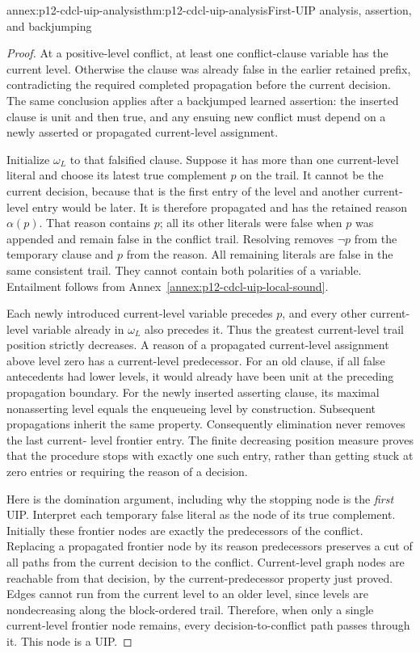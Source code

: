 \begin{annexitem}{annex:p12-cdcl-uip-analysis}{thm:p12-cdcl-uip-analysis}{First-UIP analysis, assertion, and backjumping}
\begin{proof}
At a positive-level conflict, at least one conflict-clause variable has the
current level.  Otherwise the clause was already false in the earlier retained
prefix, contradicting the required completed propagation before the current
decision.  The same conclusion applies after a backjumped learned assertion:
the inserted clause is unit and then true, and any ensuing new conflict must
depend on a newly asserted or propagated current-level assignment.

Initialize \(\omega_L\) to that falsified clause.  Suppose it has more
than one current-level literal and choose its latest true complement \(p\)
on the trail.  It cannot be the current decision, because that is the first
entry of the level and another current-level entry would be later.  It is
therefore propagated and has the retained reason \(\alpha(p)\).  That
reason contains \(p\); all its other literals were false when \(p\)
was appended and remain false in the conflict trail.  Resolving removes
\(\neg p\) from the temporary clause and \(p\) from the reason.
All remaining literals are false in the same consistent trail.  They cannot
contain both polarities of a variable.  Entailment follows from
Annex~\ref{annex:p12-cdcl-uip-local-sound}.

Each newly introduced current-level variable precedes \(p\), and every
other current-level variable already in \(\omega_L\) also precedes it.
Thus the greatest current-level trail position strictly decreases.  A reason
of a propagated current-level assignment above level zero has a current-level
predecessor.  For an old clause, if all false antecedents had lower levels,
it would already have been unit at the preceding propagation boundary.  For
the newly inserted asserting clause, its maximal nonasserting level equals
the enqueueing level by construction.  Subsequent propagations inherit the
same property.  Consequently elimination never removes the last current-
level frontier entry.  The finite decreasing position measure proves that
the procedure stops with exactly one such entry, rather than getting stuck
at zero entries or requiring the reason of a decision.

Here is the domination argument, including why the stopping node is the
\emph{first} UIP.  Interpret each temporary false literal as the node of its
true complement.  Initially these frontier nodes are exactly the predecessors
of the conflict.  Replacing a propagated frontier node by its reason
predecessors preserves a cut of all paths from the current decision to the
conflict.  Current-level graph nodes are reachable from that decision, by
the current-predecessor property just proved.  Edges cannot run from the
current level to an older level, since levels are nondecreasing along the
block-ordered trail.  Therefore, when only a single current-level frontier
node remains, every decision-to-conflict path passes through it.  This node
is a UIP.


\end{proof}
\end{annexitem}
